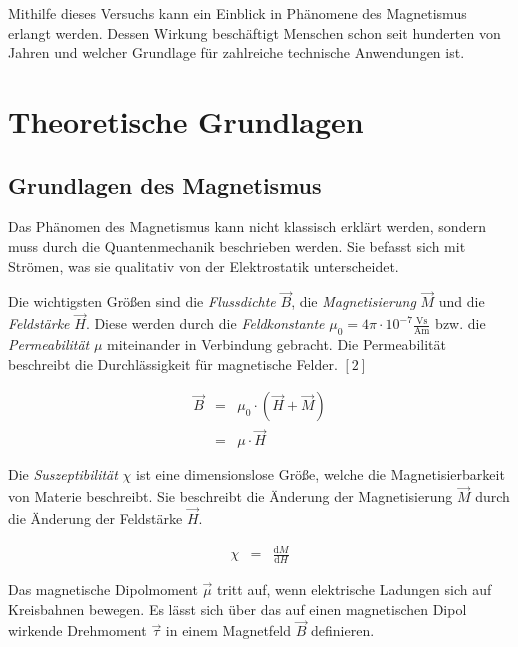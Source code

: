 \documentclass[12pt,a4paper]{scrartcl}
\numberwithin{equation}{section} %
\newcommand{\pu}[1]{\ensuremath{\mathrm{#1}}}
\renewcommand{\[}{} %
\renewcommand{\]}{\noindent} %
\begin{document}
Mithilfe dieses Versuchs kann ein Einblick in Phänomene des Magnetismus
erlangt werden. Dessen Wirkung beschäftigt Menschen schon seit hunderten
von Jahren und welcher Grundlage für zahlreiche technische Anwendungen
ist.

\hypertarget{theoretische-grundlagen}{%
\section{Theoretische Grundlagen}\label{theoretische-grundlagen}}

\hypertarget{grundlagen-des-magnetismus}{%
\subsection{Grundlagen des
Magnetismus}\label{grundlagen-des-magnetismus}}

Das Phänomen des Magnetismus kann nicht klassisch erklärt werden,
sondern muss durch die Quantenmechanik beschrieben werden. Sie befasst
sich mit Strömen, was sie qualitativ von der Elektrostatik
unterscheidet.

Die wichtigsten Größen sind die \emph{Flussdichte} \(\vec B\), die
\emph{Magnetisierung} \(\vec M\) und die \emph{Feldstärke} \(\vec H\).
Diese werden durch die \emph{Feldkonstante}
\(\mu_0=4\pi\cdot\pu{10^{-7}\frac{Vs}{Am}}\) bzw. die
\emph{Permeabilität} \(\mu\) miteinander in Verbindung gebracht. Die
Permeabilität beschreibt die Durchlässigkeit für magnetische Felder.
\([2]\)

\[
\begin{eqnarray}
    \vec B
        &=& \mu_0 \cdot \left(\vec H + \vec M\right) \label{M1} \\
        &=& \mu \cdot \vec H
\end{eqnarray}
\]

Die \emph{Suszeptibilität} \(\chi\) ist eine dimensionslose Größe,
welche die Magnetisierbarkeit von Materie beschreibt. Sie beschreibt die
Änderung der Magnetisierung \(\vec M\) durch die Änderung der Feldstärke
\(\vec H\).

\[
\begin{eqnarray}
    \chi &=& \frac{\mathrm dM}{\mathrm dH} \label{Chi}
\end{eqnarray}
\]

Das magnetische Dipolmoment \(\vec \mu\) tritt auf, wenn elektrische
Ladungen sich auf Kreisbahnen bewegen. Es lässt sich über das auf einen
magnetischen Dipol wirkende Drehmoment \(\vec \tau\) in einem Magnetfeld
\(\vec B\) definieren.
\end{document}
